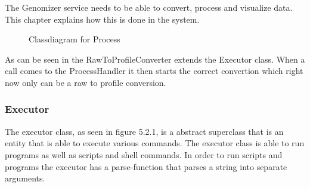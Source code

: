 The Genomizer service needs to be able to convert, process and visualize data. This chapter explains how this is done in the system.

\begin{figure}[h]
\caption{Classdiagram for Process}
\label{con_UML}
\end{figure}
	
As can be seen in  the RawToProfileConverter extends the Executor class. When a call comes to the ProcessHandler it then starts the correct convertion which right now only can be a raw to profile conversion.


\subsubsection{Executor}
The executor class, as seen in figure 5.2.1, is a abstract superclass that is an entity that is able to execute various commands. The executor class is able to run programs as well as scripts and shell commands. In order to run scripts and programs the executor has a parse-function that parses a string into separate arguments. \newline

